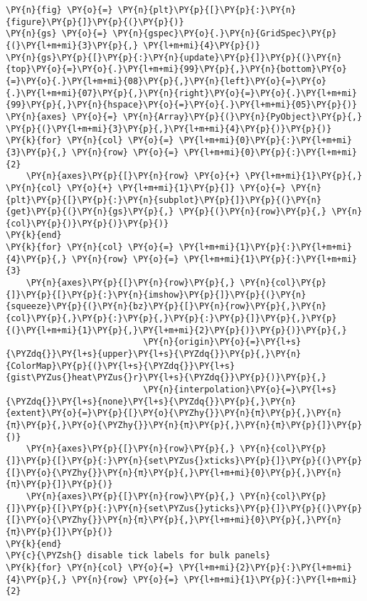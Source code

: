 \begin{Verbatim}[commandchars=\\\{\}]
\PY{n}{fig} \PY{o}{=} \PY{n}{plt}\PY{p}{[}\PY{p}{:}\PY{n}{figure}\PY{p}{]}\PY{p}{(}\PY{p}{)}
\PY{n}{gs} \PY{o}{=} \PY{n}{gspec}\PY{o}{.}\PY{n}{GridSpec}\PY{p}{(}\PY{l+m+mi}{3}\PY{p}{,} \PY{l+m+mi}{4}\PY{p}{)}
\PY{n}{gs}\PY{p}{[}\PY{p}{:}\PY{n}{update}\PY{p}{]}\PY{p}{(}\PY{n}{top}\PY{o}{=}\PY{o}{.}\PY{l+m+mi}{99}\PY{p}{,}\PY{n}{bottom}\PY{o}{=}\PY{o}{.}\PY{l+m+mi}{08}\PY{p}{,}\PY{n}{left}\PY{o}{=}\PY{o}{.}\PY{l+m+mi}{07}\PY{p}{,}\PY{n}{right}\PY{o}{=}\PY{o}{.}\PY{l+m+mi}{99}\PY{p}{,}\PY{n}{hspace}\PY{o}{=}\PY{o}{.}\PY{l+m+mi}{05}\PY{p}{)}
\PY{n}{axes} \PY{o}{=} \PY{n}{Array}\PY{p}{(}\PY{n}{PyObject}\PY{p}{,} \PY{p}{(}\PY{l+m+mi}{3}\PY{p}{,}\PY{l+m+mi}{4}\PY{p}{)}\PY{p}{)}
\PY{k}{for} \PY{n}{col} \PY{o}{=} \PY{l+m+mi}{0}\PY{p}{:}\PY{l+m+mi}{3}\PY{p}{,} \PY{n}{row} \PY{o}{=} \PY{l+m+mi}{0}\PY{p}{:}\PY{l+m+mi}{2}
    \PY{n}{axes}\PY{p}{[}\PY{n}{row} \PY{o}{+} \PY{l+m+mi}{1}\PY{p}{,} \PY{n}{col} \PY{o}{+} \PY{l+m+mi}{1}\PY{p}{]} \PY{o}{=} \PY{n}{plt}\PY{p}{[}\PY{p}{:}\PY{n}{subplot}\PY{p}{]}\PY{p}{(}\PY{n}{get}\PY{p}{(}\PY{n}{gs}\PY{p}{,} \PY{p}{(}\PY{n}{row}\PY{p}{,} \PY{n}{col}\PY{p}{)}\PY{p}{)}\PY{p}{)}
\PY{k}{end}
\PY{k}{for} \PY{n}{col} \PY{o}{=} \PY{l+m+mi}{1}\PY{p}{:}\PY{l+m+mi}{4}\PY{p}{,} \PY{n}{row} \PY{o}{=} \PY{l+m+mi}{1}\PY{p}{:}\PY{l+m+mi}{3}
    \PY{n}{axes}\PY{p}{[}\PY{n}{row}\PY{p}{,} \PY{n}{col}\PY{p}{]}\PY{p}{[}\PY{p}{:}\PY{n}{imshow}\PY{p}{]}\PY{p}{(}\PY{n}{squeeze}\PY{p}{(}\PY{n}{bz}\PY{p}{[}\PY{n}{row}\PY{p}{,}\PY{n}{col}\PY{p}{,}\PY{p}{:}\PY{p}{,}\PY{p}{:}\PY{p}{]}\PY{p}{,}\PY{p}{(}\PY{l+m+mi}{1}\PY{p}{,}\PY{l+m+mi}{2}\PY{p}{)}\PY{p}{)}\PY{p}{,}
                           \PY{n}{origin}\PY{o}{=}\PY{l+s}{\PYZdq{}}\PY{l+s}{upper}\PY{l+s}{\PYZdq{}}\PY{p}{,}\PY{n}{ColorMap}\PY{p}{(}\PY{l+s}{\PYZdq{}}\PY{l+s}{gist\PYZus{}heat\PYZus{}r}\PY{l+s}{\PYZdq{}}\PY{p}{)}\PY{p}{,}
                           \PY{n}{interpolation}\PY{o}{=}\PY{l+s}{\PYZdq{}}\PY{l+s}{none}\PY{l+s}{\PYZdq{}}\PY{p}{,}\PY{n}{extent}\PY{o}{=}\PY{p}{[}\PY{o}{\PYZhy{}}\PY{n}{π}\PY{p}{,}\PY{n}{π}\PY{p}{,}\PY{o}{\PYZhy{}}\PY{n}{π}\PY{p}{,}\PY{n}{π}\PY{p}{]}\PY{p}{)}
    \PY{n}{axes}\PY{p}{[}\PY{n}{row}\PY{p}{,} \PY{n}{col}\PY{p}{]}\PY{p}{[}\PY{p}{:}\PY{n}{set\PYZus{}xticks}\PY{p}{]}\PY{p}{(}\PY{p}{[}\PY{o}{\PYZhy{}}\PY{n}{π}\PY{p}{,}\PY{l+m+mi}{0}\PY{p}{,}\PY{n}{π}\PY{p}{]}\PY{p}{)}
    \PY{n}{axes}\PY{p}{[}\PY{n}{row}\PY{p}{,} \PY{n}{col}\PY{p}{]}\PY{p}{[}\PY{p}{:}\PY{n}{set\PYZus{}yticks}\PY{p}{]}\PY{p}{(}\PY{p}{[}\PY{o}{\PYZhy{}}\PY{n}{π}\PY{p}{,}\PY{l+m+mi}{0}\PY{p}{,}\PY{n}{π}\PY{p}{]}\PY{p}{)}
\PY{k}{end}
\PY{c}{\PYZsh{} disable tick labels for bulk panels}
\PY{k}{for} \PY{n}{col} \PY{o}{=} \PY{l+m+mi}{2}\PY{p}{:}\PY{l+m+mi}{4}\PY{p}{,} \PY{n}{row} \PY{o}{=} \PY{l+m+mi}{1}\PY{p}{:}\PY{l+m+mi}{2}

\end{Verbatim}
